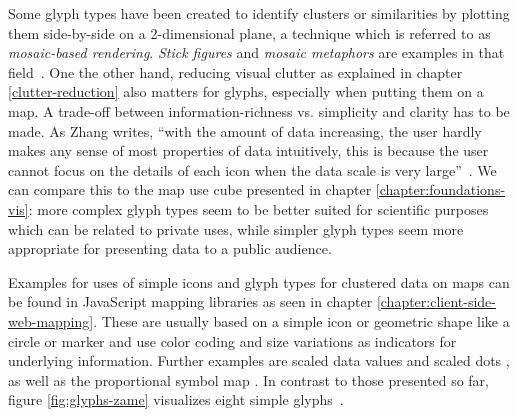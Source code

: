 \begin{itemize}
Some glyph types have been created to identify clusters or similarities by plotting them side-by-side on a 2-dimensional plane, a technique which is referred to as \textit{mosaic-based rendering}. \textit{Stick figures} and \textit{mosaic metaphors} are examples in that field~\cite{stickfigures, nocke05mosaic}. One the other hand, reducing visual clutter as explained in chapter \ref{clutter-reduction} also matters for glyphs, especially when putting them on a map. A trade-off between information-richness vs. simplicity and clarity has to be made. As Zhang writes, ``with the amount of data increasing, the user hardly makes any sense of most properties of data intuitively, this is because the user cannot focus on the details of each icon when the data scale is very large''~\cite{zhang07thesis}. We can compare this to the map use cube presented in chapter \ref{chapter:foundations-vis}: more complex glyph types seem to be better suited for scientific purposes which can be related to private uses, while simpler glyph types seem more appropriate for presenting data to a public audience.

Examples for uses of simple icons and glyph types for clustered data on maps can be found in JavaScript mapping libraries as seen in chapter \ref{chapter:client-side-web-mapping}. These are usually based on a simple icon or geometric shape like a circle or marker and use color coding and size variations as indicators for underlying information. Further examples are scaled data values and scaled dots \cite{web:scaled-data-value}, as well as the proportional symbol map \cite{vislecture}. In contrast to those presented so far, figure \ref{fig:glyphs-zame} visualizes eight simple glyphs~\cite{ElmqvistDGHF08}.


\end{itemize}
